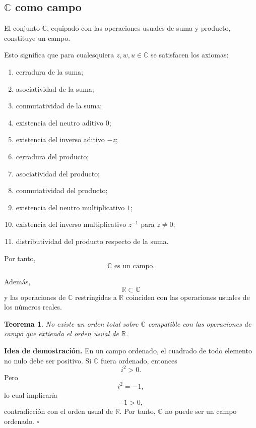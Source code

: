 \documentclass[12pt]{article}
\newtheorem{Teo}{Teorema}
\begin{document}
\subsection*{$\mathbb{C}$ como campo}

El conjunto $\mathbb{C}$, equipado con las operaciones usuales de suma y producto, constituye un campo.

Esto significa que para cualesquiera $z,w,u\in\mathbb{C}$ se satisfacen
los axiomas:

\begin{enumerate}
    \item cerradura de la suma;
    \item asociatividad de la suma;
    \item conmutatividad de la suma;
    \item existencia del neutro aditivo $0$;
    \item existencia del inverso aditivo $-z$;
    \item cerradura del producto;
    \item asociatividad del producto;
    \item conmutatividad del producto;
    \item existencia del neutro multiplicativo $1$;
    \item existencia del inverso multiplicativo $z^{-1}$ para $z\neq0$;
    \item distributividad del producto respecto de la suma.
\end{enumerate}

Por tanto,
\[
\boxed{\mathbb{C}\text{ es un campo}.}
\]

Además,
\[
\boxed{\mathbb{R}\subset\mathbb{C}}
\]
y las operaciones de $\mathbb{C}$ restringidas a $\mathbb{R}$ coinciden con
las operaciones usuales de los números reales.

\begin{Teo}
No existe un orden total sobre $\mathbb{C}$ compatible con las operaciones
de campo que extienda el orden usual de $\mathbb{R}$.
\end{Teo}

\textbf{Idea de demostración.}
En un campo ordenado, el cuadrado de todo elemento no nulo debe ser positivo.
Si $\mathbb{C}$ fuera ordenado, entonces
\[
i^2>0.
\]
Pero
\[
i^2=-1,
\]
lo cual implicaría
\[
-1>0,
\]
contradicción con el orden usual de $\mathbb{R}$.
Por tanto, $\mathbb{C}$ no puede ser un campo ordenado.
\hfill$\square$
\end{document}
